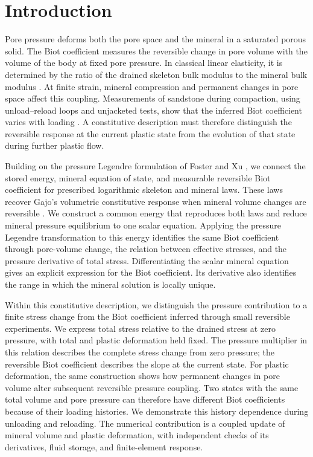 \section{Introduction}
\label{sec:introduction}

Pore pressure deforms both the pore space and the mineral in a saturated
porous solid.  The Biot coefficient measures the reversible change in pore
volume with the volume of the body at fixed pore pressure.  In classical
linear elasticity, it is determined by the ratio of the drained skeleton
bulk modulus to the mineral bulk modulus \citep{biotwillis1957}.  At finite
strain, mineral compression and permanent changes in pore space affect
this coupling.  Measurements of sandstone during compaction, using
unload--reload loops and unjacketed tests, show that the inferred Biot coefficient
varies with loading \citep{ingraham2017evolution}.  A constitutive description
must therefore distinguish the reversible response at the current plastic
state from the evolution of that state during further plastic flow.

Building on the pressure Legendre formulation of Foster and Xu
\citep{fosterxu2025}, we connect the stored energy, mineral equation of
state, and measurable reversible Biot coefficient for prescribed
logarithmic skeleton and mineral laws.  These laws recover Gajo's
volumetric constitutive response when mineral volume changes are reversible
\citep{gajo2010,gajo2011}.  We
construct a common energy that reproduces both laws and reduce mineral
pressure equilibrium to one scalar equation.  Applying the pressure Legendre
transformation to this energy identifies the same Biot coefficient through
pore-volume change, the relation between effective stresses, and the
pressure derivative of total stress.  Differentiating the scalar mineral
equation gives an explicit expression for the Biot coefficient.  Its derivative
also identifies the range in which the mineral solution is locally unique.

Within this constitutive description, we distinguish the pressure
contribution to a finite stress change from the Biot coefficient inferred through
small reversible experiments.  We express total stress relative to the
drained stress at zero pressure,
with total and plastic deformation held fixed.  The pressure multiplier
in this relation describes the complete stress change from zero pressure;
the reversible Biot coefficient describes the slope at the current state.
For plastic deformation, the same construction shows how permanent changes
in pore volume alter subsequent reversible pressure coupling.  Two states
with the same total volume and pore pressure can therefore have different
Biot coefficients because of their loading histories.  We demonstrate this
history dependence during unloading and reloading.  The numerical
contribution is a coupled update of mineral volume and plastic deformation,
with independent checks of its derivatives, fluid storage, and
finite-element response.

